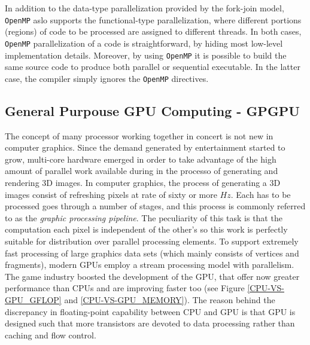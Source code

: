     In addition to the data-type parallelization provided by the
    fork-join model, \texttt{OpenMP} aslo supports the functional-type
    parallelization, where different portions (regions) of code to be
    processed are assigned to different threads. In both cases, \texttt{OpenMP}
    parallelization of a code is straightforward, by hiding most
    low-level implementation details. Moreover, by using \texttt{OpenMP} it is
    possible to build the same source code to produce both parallel or
    sequential executable. In the latter case, the compiler simply
    ignores the \texttt{OpenMP} directives.
    
    
    \subsection{General Purpouse GPU Computing - GPGPU}
    The concept of many processor working together in concert is not new in computer graphics. Since the demand generated by entertainment started to grow, multi-core hardware emerged in order to take advantage of the high amount of parallel work available during in the processo of generating and rendering 3D images.
    In computer graphics, the process of generating a 3D images consist of
    refreshing pixels at rate of sixty or more $\si{Hz}$. Each has to be processed goes through a number of stages, and this process is commonly referred to as the \emph{graphic processing pipeline}. The peculiarity of this task is that the  computation each pixel is independent of the other's so this work is perfectly suitable for distribution over parallel processing elements. To support extremely fast processing of large graphics data sets (which mainly consists of vertices and fragments), modern GPUs employ a stream processing model with parallelism.
    The game industry boosted the development of the GPU, that offer now greater
    performance than CPUs and are improving faster too (see Figure
    \ref{CPU-VS-GPU_GFLOP} and \ref{CPU-VS-GPU_MEMORY}).
    The reason behind the discrepancy in floating-point capability between CPU and  GPU is that GPU is designed such that more transistors are devoted to data  processing rather than caching and flow control.
    
